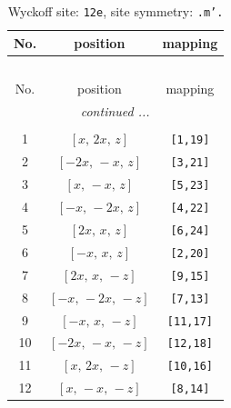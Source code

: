 \documentclass[fleqn,8pt]{jsarticle}
\begin{document}
\begin{longtable}{ccc}
\caption{Wyckoff site: {\tt 12e}, site symmetry: {\tt .m'.}}
 \\
 \hline \hline
No. & position & mapping \\ \hline \endfirsthead

\multicolumn{2}{l}{\tablename\ \thetable{}} \\
 \hline \hline
No. & position & mapping \\ \hline \endhead

 \hline \hline
\multicolumn{2}{r}{\footnotesize\it continued ...} \\ \endfoot

 \hline \hline
\multicolumn{2}{r}{} \\ \endlastfoot

1 & $\left[ x,\, 2 x,\, z \right]$ & {\tt [1,19]} \\ \hline
2 & $\left[ - 2 x,\, - x,\, z \right]$ & {\tt [3,21]} \\ \hline
3 & $\left[ x,\, - x,\, z \right]$ & {\tt [5,23]} \\ \hline
4 & $\left[ - x,\, - 2 x,\, z \right]$ & {\tt [4,22]} \\ \hline
5 & $\left[ 2 x,\, x,\, z \right]$ & {\tt [6,24]} \\ \hline
6 & $\left[ - x,\, x,\, z \right]$ & {\tt [2,20]} \\ \hline
7 & $\left[ 2 x,\, x,\, - z \right]$ & {\tt [9,15]} \\ \hline
8 & $\left[ - x,\, - 2 x,\, - z \right]$ & {\tt [7,13]} \\ \hline
9 & $\left[ - x,\, x,\, - z \right]$ & {\tt [11,17]} \\ \hline
10 & $\left[ - 2 x,\, - x,\, - z \right]$ & {\tt [12,18]} \\ \hline
11 & $\left[ x,\, 2 x,\, - z \right]$ & {\tt [10,16]} \\ \hline
12 & $\left[ x,\, - x,\, - z \right]$ & {\tt [8,14]} \\
\end{longtable}
\renewcommand{\arraystretch}{1.2}
\end{document}
